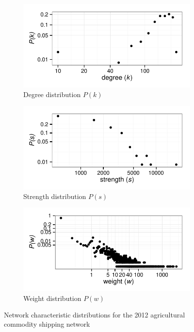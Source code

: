 \documentclass[12pt]{article}
\begin{document}
\begin{figure}[h]
	\centering
	\begin{subfigure}[b]{0.5\textwidth}
		\centering
        	\includegraphics[width=\textwidth]{degree_dist.pdf}
        	\caption{Degree distribution $P(k)$}
        	\label{fig:degree dist}
	\end{subfigure}
	\hfill
	\begin{subfigure}[b]{0.5\textwidth}
		\centering
        	\includegraphics[width=\textwidth]{strength_dist.pdf}
        	\caption{Strength distribution $P(s)$}
        	\label{fig:strength dist}
	\end{subfigure}
	\hfill
	\begin{subfigure}[b]{0.5\textwidth}
		\centering
    		\includegraphics[width=\textwidth]{weight_dist.pdf}
   		\caption{Weight distribution $P(w)$}
        	\label{fig:weight dist}
	\end{subfigure}
	\caption{Network characteristic distributions for the 2012 agricultural commodity shipping network}
	\label{fig:distributions}
\end{figure}
		
\end{document}
